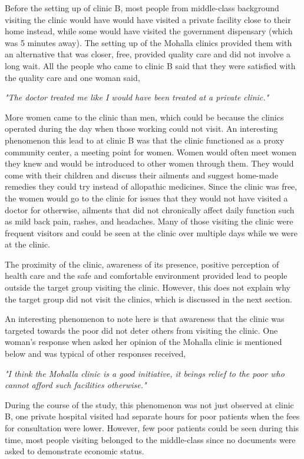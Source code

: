Before the setting up of clinic B, most people from middle-class background visiting the clinic would have would have visited a private facility close to their home instead, while some would have visited the government dispensary (which was 5 minutes away). The setting up of the Mohalla clinics provided them with an alternative that was closer, free, provided quality care and did not involve a long wait. All the people who came to clinic B said that they were satisfied with the quality care and one woman said,

\textit{"The doctor treated me like I would have been treated at a private clinic."}

More women came to the clinic than men, which could be because the clinics operated during the day when those working could not visit. An interesting phenomenon this lead to at clinic B was that the clinic functioned as a proxy community center, a meeting point for women. Women would often meet women they knew and would be introduced to other women through them. They would come with their children and discuss their ailments and suggest home-made remedies they could try instead of allopathic medicines. Since the clinic was free, the women would go to the clinic for issues that they would not have visited a doctor for otherwise, ailments that did not chronically affect daily function such as mild back pain, rashes, and headaches. Many of those visiting the clinic were frequent visitors and could be seen at the clinic over multiple days while we were at the clinic. 

The proximity of the clinic, awareness of its presence, positive perception of health care and the safe and comfortable environment provided lead to people outside the target group visiting the clinic. However, this does not explain why the target group did not visit the clinics, which is discussed in the next section. 

An interesting phenomenon to note here is that awareness that the clinic was targeted towards the poor did not deter others from visiting the clinic. One woman's response when asked her opinion of the Mohalla clinic is mentioned below and was typical of other responses received, 

\textit{"I think the Mohalla clinic is a good initiative, it beings relief to the poor who cannot afford such facilities otherwise."}

During the course of the study, this phenomenon was not just observed at clinic B, one private hospital visited had separate hours for poor patients when the fees for consultation were lower. However, few poor patients could be seen during this time, most people visiting belonged to the middle-class since no documents were asked to demonstrate economic status.

